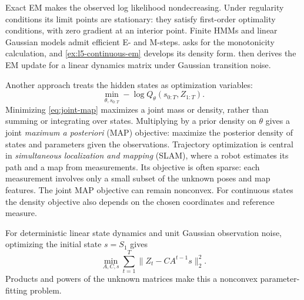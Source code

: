 \documentclass[11pt,twoside]{article}
\theoremstyle{definition}
\theoremstyle{remark}
\begin{document}
Exact EM makes the observed log likelihood nondecreasing.
Under regularity
conditions its limit points are stationary: they satisfy first-order
optimality conditions, with zero gradient at an interior point.
Finite HMMs and linear Gaussian models admit efficient E- and M-steps.
 asks for the monotonicity calculation, and
\cref{ex:l5-continuous-em} develops its density form.
 then derives the EM update for a linear dynamics
matrix under Gaussian transition noise.

Another approach treats the hidden states as optimization variables:
\begin{equation}
 \min_{\theta,s_{0:T}}-\log Q_\theta(s_{0:T},Z_{1:T}).
 \label{eq:joint-map}
\end{equation}
Minimizing \cref{eq:joint-map} maximizes a joint mass or density, rather than summing or integrating
over states. Multiplying by a prior density on \(\theta\) gives a joint
\emph{maximum a posteriori} (MAP) objective: maximize the posterior
density of states and parameters given the observations.
Trajectory optimization is central in \emph{simultaneous localization
and mapping} (SLAM), where a robot estimates its path and a map from
measurements. Its objective is often sparse: each measurement involves
only a small subset of the unknown poses and map features.
The joint MAP objective can remain nonconvex. For continuous states the density objective also
depends on the chosen coordinates and reference measure.

For deterministic linear state dynamics and unit Gaussian observation
noise, optimizing the initial state \(s=S_1\) gives
\[
 \min_{A,C,s}\sum_{t=1}^T\|Z_t-CA^{t-1}s\|_2^2.
\]
Products and powers of the unknown matrices make this a nonconvex
parameter-fitting problem.
\end{document}
